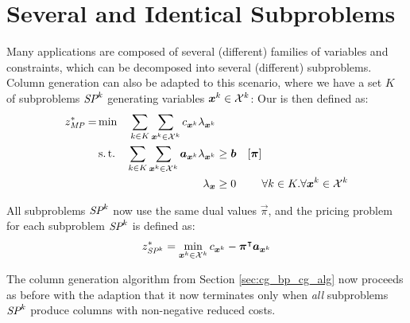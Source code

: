 \section{Several and Identical Subproblems}\label{sec:cg_bp_idsp}
Many applications are composed of several (different) families of variables and constraints, which can be decomposed into several (different) subproblems. Column generation can also be adapted to this scenario, where we have a set $K$ of subproblems $\SP{k}$ generating variables ${\bm{x}}^k \in \mathcal{X}^k$: Our \MP{} is then defined as:
\begin{equation}
\begin{aligned}
z^*_{\textit{MP}}{} = &\min & \sum_{k \in K}\sum_{{\bm{x}}^k \in \mathcal{X}^k} c_{{\bm{x}}^k} \lambda_{{\bm{x}}^k} & & & \\
&\operatorname{s.t.} & \sum_{k \in K}\sum_{{\bm{x}}^k \in \mathcal{X}^k} {\bm{a}}_{{\bm{x}}^k} \lambda_{{\bm{x}}^k} & \geq {\bm{b}} & \left[{\bm{\pi}}\right] & \\
&& \lambda_{\bm{x}} & \geq 0 & & \forall k \in K. \forall {{\bm{x}}^k} \in \mathcal{X}^k
\end{aligned}
\end{equation}

All subproblems $\SP{k}$ now use the same dual values $\vec{\pi}$, and the pricing problem for each subproblem $\SP{k}$ is defined as:
\begin{equation}
\begin{aligned}
z^*_\SP{k} = \underset{\vec{x}^k \in \indexset{X}^k}{\min} \, c_{\vec{x}^k} - \vec{\pi}\transpose \vec{a}_{\vec{x}^k}
\end{aligned}
\end{equation}

The column generation algorithm from Section \ref{sec:cg_bp_cg_alg} now proceeds as before with the adaption that it now terminates only when \textit{all} subproblems $\SP{k}$ produce columns with non-negative reduced costs.

